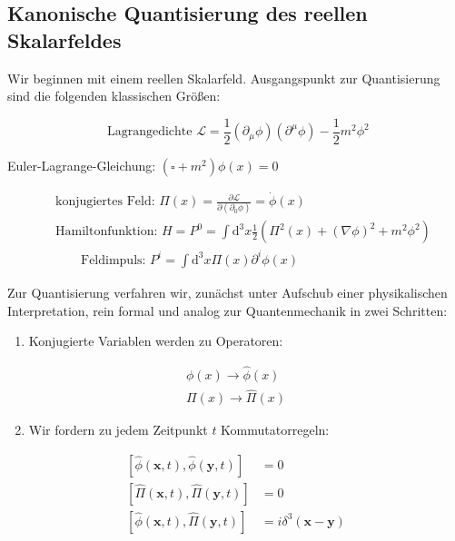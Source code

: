 \documentclass[10pt, letterpaper]{article}
\begin{document}
\subsection*{Kanonische Quantisierung des reellen Skalarfeldes}
Wir beginnen mit einem reellen Skalarfeld. Ausgangspunkt zur Quantisierung sind die folgenden klassischen Größen:

$$
\text { Lagrangedichte } \mathscr{L}=\frac{1}{2}\left(\partial_{\mu} \phi\right)\left(\partial^{\mu} \phi\right)-\frac{1}{2} m^{2} \phi^{2}
$$

Euler-Lagrange-Gleichung: $\left(\square+m^{2}\right) \phi(x)=0$

$$
\begin{aligned}
& \text { konjugiertes Feld: } \Pi(x)=\frac{\partial \mathscr{L}}{\partial\left(\partial_{0} \phi\right)}=\dot{\phi}(x) \\
& \text { Hamiltonfunktion: } H=P^{0}=\int \mathrm{d}^{3} x \frac{1}{2}\left(\Pi^{2}(x)+(\nabla \phi)^{2}+m^{2} \phi^{2}\right) \\
& \qquad \text { Feldimpuls: } P^{i}=\int \mathrm{d}^{3} x \Pi(x) \partial^{i} \phi(x)
\end{aligned}
$$

Zur Quantisierung verfahren wir, zunächst unter Aufschub einer physikalischen Interpretation, rein formal und analog zur Quantenmechanik in zwei Schritten:

\begin{enumerate}
  \item Konjugierte Variablen werden zu Operatoren:
\end{enumerate}

$$
\begin{gathered}
\phi(x) \rightarrow \hat{\phi}(x) \\
\Pi(x) \rightarrow \hat{\Pi}(x)
\end{gathered}
$$

\begin{enumerate}
  \setcounter{enumi}{1}
  \item Wir fordern zu jedem Zeitpunkt $t$ Kommutatorregeln:
\end{enumerate}

$$
\begin{aligned}
{[\hat{\phi}(\mathbf{x}, t), \hat{\phi}(\mathbf{y}, t)] } & =0 \\
{[\hat{\Pi}(\mathbf{x}, t), \hat{\Pi}(\mathbf{y}, t)] } & =0 \\
{[\hat{\phi}(\mathbf{x}, t), \hat{\Pi}(\mathbf{y}, t)] } & =i \delta^{3}(\mathbf{x}-\mathbf{y})
\end{aligned}
$$
\end{document}
